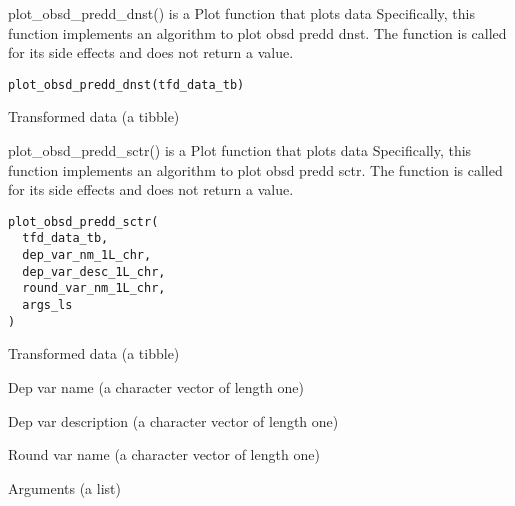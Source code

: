 \documentclass[a4paper]{book}
\begin{document}
%
\begin{Description}\relax
plot\_obsd\_predd\_dnst() is a Plot function that plots data Specifically, this function implements an algorithm to plot obsd predd dnst. The function is called for its side effects and does not return a value.
\end{Description}
%
\begin{Usage}
\begin{verbatim}
plot_obsd_predd_dnst(tfd_data_tb)
\end{verbatim}
\end{Usage}
%
\begin{Arguments}
\begin{ldescription}
\item[\code{tfd\_data\_tb}] Transformed data (a tibble)
\end{ldescription}
\end{Arguments}
%
\begin{Description}\relax
plot\_obsd\_predd\_sctr() is a Plot function that plots data Specifically, this function implements an algorithm to plot obsd predd sctr. The function is called for its side effects and does not return a value.
\end{Description}
%
\begin{Usage}
\begin{verbatim}
plot_obsd_predd_sctr(
  tfd_data_tb,
  dep_var_nm_1L_chr,
  dep_var_desc_1L_chr,
  round_var_nm_1L_chr,
  args_ls
)
\end{verbatim}
\end{Usage}
%
\begin{Arguments}
\begin{ldescription}
\item[\code{tfd\_data\_tb}] Transformed data (a tibble)

\item[\code{dep\_var\_nm\_1L\_chr}] Dep var name (a character vector of length one)

\item[\code{dep\_var\_desc\_1L\_chr}] Dep var description (a character vector of length one)

\item[\code{round\_var\_nm\_1L\_chr}] Round var name (a character vector of length one)

\item[\code{args\_ls}] Arguments (a list)
\end{ldescription}
\end{Arguments}
\end{document}
